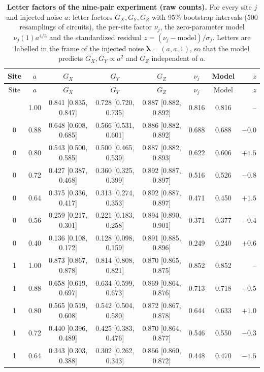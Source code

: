 \begin{longtable}{cccccccr}
\caption{\textbf{Letter factors of the nine-pair experiment (raw counts).} For every site $j$ and injected noise $a$: letter factors $G_X,G_Y,G_Z$ with 95\% bootstrap intervals (500 resamplings of circuits), the per-site factor $\nu_j$, the zero-parameter model $\nu_j(1)a^{4/3}$ and the standardized residual $z=(\nu_j-\text{model})/\sigma_j$. Letters are labelled in the frame of the injected noise $\boldsymbol\lambda=(a,a,1)$, so that the model predicts $G_X,G_Y\propto a^2$ and $G_Z$ independent of $a$.}\label{tab:letters}\\\toprule
Site & $a$ & $G_X$ & $G_Y$ & $G_Z$ & $\nu_j$ & Model & $z$\\\midrule\endfirsthead
\toprule Site & $a$ & $G_X$ & $G_Y$ & $G_Z$ & $\nu_j$ & Model & $z$\\\midrule\endhead
\bottomrule\endfoot
0 & 1.00 & 0.841 [0.835, 0.847] & 0.728 [0.720, 0.735] & 0.887 [0.882, 0.892] & 0.816 & 0.816 & --\\
0 & 0.88 & 0.648 [0.608, 0.685] & 0.566 [0.531, 0.601] & 0.886 [0.882, 0.892] & 0.688 & 0.688 & $-0.0$\\
0 & 0.80 & 0.543 [0.500, 0.585] & 0.500 [0.465, 0.539] & 0.887 [0.882, 0.893] & 0.622 & 0.606 & $+1.5$\\
0 & 0.72 & 0.427 [0.387, 0.468] & 0.360 [0.325, 0.399] & 0.892 [0.887, 0.897] & 0.516 & 0.526 & $-0.8$\\
0 & 0.64 & 0.375 [0.336, 0.417] & 0.313 [0.274, 0.353] & 0.892 [0.887, 0.897] & 0.471 & 0.450 & $+1.5$\\
0 & 0.56 & 0.259 [0.217, 0.301] & 0.221 [0.183, 0.258] & 0.894 [0.890, 0.901] & 0.371 & 0.377 & $-0.4$\\
0 & 0.40 & 0.136 [0.108, 0.172] & 0.128 [0.098, 0.159] & 0.891 [0.885, 0.896] & 0.249 & 0.240 & $+0.6$\\
\midrule
1 & 1.00 & 0.873 [0.867, 0.878] & 0.814 [0.808, 0.821] & 0.870 [0.865, 0.875] & 0.852 & 0.852 & --\\
1 & 0.88 & 0.658 [0.619, 0.697] & 0.634 [0.599, 0.673] & 0.869 [0.864, 0.876] & 0.713 & 0.718 & $-0.5$\\
1 & 0.80 & 0.565 [0.519, 0.608] & 0.542 [0.504, 0.580] & 0.872 [0.867, 0.878] & 0.644 & 0.633 & $+1.0$\\
1 & 0.72 & 0.440 [0.396, 0.489] & 0.425 [0.383, 0.476] & 0.870 [0.864, 0.877] & 0.546 & 0.550 & $-0.3$\\
1 & 0.64 & 0.343 [0.303, 0.388] & 0.302 [0.262, 0.343] & 0.866 [0.860, 0.872] & 0.448 & 0.470 & $-1.5$\\

\end{longtable}
